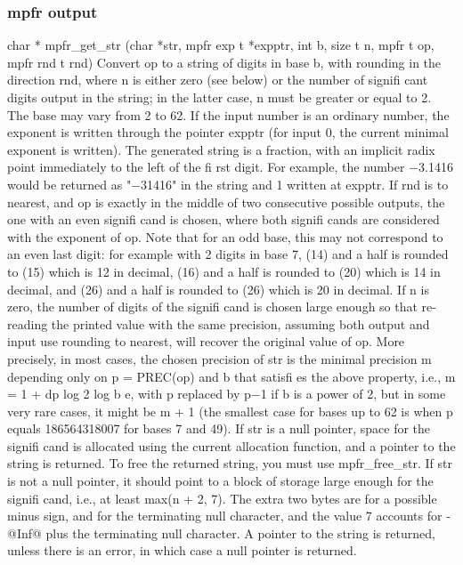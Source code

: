 \subsubsection{mpfr output}
char * mpfr\_get\_str (char *str, mpfr exp t *expptr, int b, size t n,
mpfr t op, mpfr rnd t rnd)
Convert op to a string of digits in base b, with rounding in the direction rnd, where n is
either zero (see below) or the number of signifi cant digits output in the string; in the latter
case, n must be greater or equal to 2. The base may vary from 2 to 62. If the input number
is an ordinary number, the exponent is written through the pointer expptr (for input 0, the
current minimal exponent is written).
The generated string is a fraction, with an implicit radix point immediately to the left of the
fi rst digit. For example, the number −3.1416 would be returned as "−31416" in the string and
1 written at expptr. If rnd is to nearest, and op is exactly in the middle of two consecutive
possible outputs, the one with an even signifi cand is chosen, where both signifi cands are
considered with the exponent of op. Note that for an odd base, this may not correspond to
an even last digit: for example with 2 digits in base 7, (14) and a half is rounded to (15)
which is 12 in decimal, (16) and a half is rounded to (20) which is 14 in decimal, and (26)
and a half is rounded to (26) which is 20 in decimal.
If n is zero, the number of digits of the signifi cand is chosen large enough so that re-reading
the printed value with the same precision, assuming both output and input use rounding
to nearest, will recover the original value of op. More precisely, in most cases, the chosen
precision of str is the minimal precision m depending only on p = PREC(op) and b that
satisfi es the above property, i.e., m = 1 + dp
log 2
log b
e, with p replaced by p−1 if b is a power
of 2, but in some very rare cases, it might be m + 1 (the smallest case for bases up to 62 is
when p equals 186564318007 for bases 7 and 49).
If str is a null pointer, space for the signifi cand is allocated using the current allocation
function, and a pointer to the string is returned. To free the returned string, you must use
mpfr\_free\_str.
If str is not a null pointer, it should point to a block of storage large enough for the signifi cand,
i.e., at least max(n + 2, 7). The extra two bytes are for a possible minus sign, and for the
terminating null character, and the value 7 accounts for -@Inf@ plus the terminating null
character.
A pointer to the string is returned, unless there is an error, in which case a null pointer is
returned.


